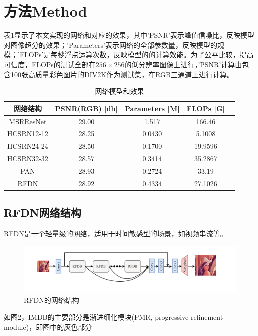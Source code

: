 \documentclass{cjc}
\begin{document}
\section{方法Method}
表1显示了本文实现的网络和对应的效果，其中'PSNR'表示峰值信噪比，反映模型对图像超分的效果；'Parameters'表示网络的全部参数量，反映模型的规模；'FLOPs'是每秒浮点运算次数，反映模型的的计算效能。为了公平比较，提高可信度，FLOPs的测试全部在$256\times256$的低分辨率图像上进行，'PSNR'计算由包含100张高质量彩色图片的DIV2K\cite{div2k}作为测试集，在RGB三通道上进行计算。

\begin{table}[htb]
  \centering
  \caption{网络模型和效果}
  \small
  \begin{tabular}{c|cccc}
    \toprule
    网络结构 & PSNR(RGB) [db]& Parameters [M] & FLOPs [G]\\
    \midrule
    MSRResNet & 29.00  & 1.517 & 166.46\\
    \midrule
    HCSRN12-12    & 28.25 & 0.0430 & 5.1008 \\
    \midrule
    HCSRN24-24    & 28.50 & 0.1700 & 19.9596 \\
    \midrule
    HCSRN32-32    & 28.57 & 0.3414 & 35.2867 \\
    \midrule
    PAN           & 28.93 & 0.2724 & 33.19 \\
    \midrule
    RFDN          & 28.92 & 0.4334 & 27.1026 \\
    \bottomrule
  \end{tabular}
\end{table}

\subsection{RFDN网络结构}
RFDN是一个轻量级的网络，适用于时间敏感型的场景，如视频串流等。
\begin{figure}[htb]
  \centering
  \includegraphics[width=\linewidth]{image/rfdn.png}
  \caption{RFDN的网络结构}
\end{figure}
如图2，IMDB的主要部分是渐进细化模块(PMR, progressive refinement module)，即图中的灰色部分
\end{document}
